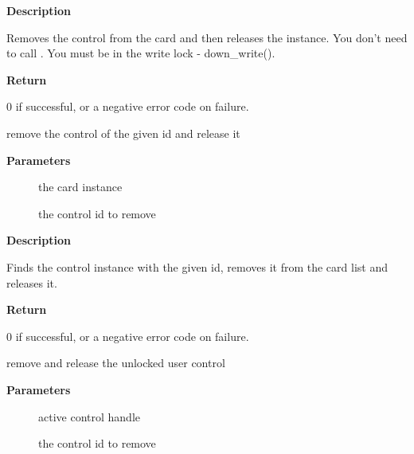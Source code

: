 \documentclass[a4paper,8pt,english]{sphinxmanual}
\begin{document}
\textbf{Description}

Removes the control from the card and then releases the instance.
You don't need to call . You must be in
the write lock - down\_write().

\textbf{Return}

0 if successful, or a negative error code on failure.

\begin{fulllineitems}
\label{sound/kernel-api/alsa-driver-api:c.snd_ctl_remove_id}
remove the control of the given id and release it

\end{fulllineitems}


\textbf{Parameters}
\begin{description}
\item[{}] \leavevmode
the card instance

\item[{}] \leavevmode
the control id to remove

\end{description}

\textbf{Description}

Finds the control instance with the given id, removes it from the
card list and releases it.

\textbf{Return}

0 if successful, or a negative error code on failure.

\begin{fulllineitems}
\label{sound/kernel-api/alsa-driver-api:c.snd_ctl_remove_user_ctl}
remove and release the unlocked user control

\end{fulllineitems}


\textbf{Parameters}
\begin{description}
\item[{}] \leavevmode
active control handle

\item[{}] \leavevmode
the control id to remove

\end{description}
\end{document}
